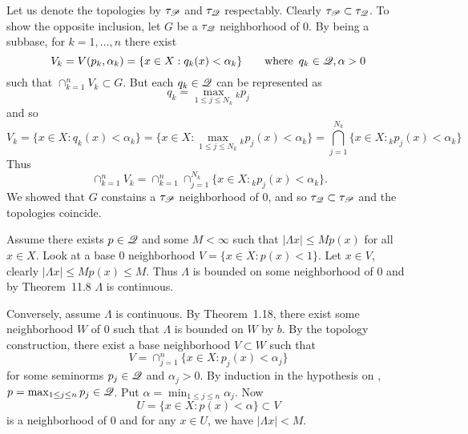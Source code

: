 \begin{enumerate}
\begin{itemize}
  Let us denote the topologies by \(\tau_{\mathscr{P}}\) and \(\tau_{\mathscr{Q}}\)
  respectably.
  Clearly  \(\tau_{\mathscr{P}} \subset \tau_{\mathscr{Q}}\).
  To show the opposite inclusion, let $G$ be a \(\tau_{\mathscr{Q}}\)
  neighborhood of $0$. By being a subbase, for \(k=1,\ldots,n\)
  there exist
  \begin{equation*}
    V_k = V(p_k,\alpha_k) = \{x\in X: q_k(x) < \alpha_k\}
     \qquad \textrm{where }\, q_k\in \mathscr{Q}, \alpha > 0
  \end{equation*}
  such that \(\cap_{k=1}^n V_k \subset G\).
  But each \(q_k\in \mathscr{Q}\) can be represented as
  \begin{equation*}
  q_k = \max_{1\leq j\leq N_k} {}_{k}p_j
  \end{equation*}
  and so 
  \begin{equation*}
  V_k = \{x\in X: q_k(x) < \alpha_k\} 
      = \{x\in X:  \max_{1\leq j\leq N_k} {}_{k}p_j(x) < \alpha_k\}
      = \bigcap_{j=1}^{N_k} \{x\in X: {}_{k}p_j(x) < \alpha_k\}
  \end{equation*}
  Thus 
  \begin{equation*}\
    \cap_{k=1}^n V_k 
     = \cap_{k=1}^n\cap_{j=1}^{N_k} \{x\in X: {}_{k}p_j(x) < \alpha_k\}.
  \end{equation*}
  We showed that $G$ constains a \(\tau_{\mathscr{P}}\) neighborhood of $0$,
  and so \(\tau_{\mathscr{Q}} \subset \tau_{\mathscr{P}}\) and the topologies
  coincide.

  Assume there exists \(p\in \mathscr{Q}\) and some \(M<\infty\) 
  such that \(|\Lambda x| \leq Mp(x)\) for  all \(x\in X\).
  Look at a base $0$ neighborhood \(V = \{x\in X: p(x)<1\}\).
  Let \(x\in V\), 
  clearly \(|\Lambda x| \leq Mp(x) \leq M\).
  Thus \(\Lambda\) is bounded on some neighborhood of $0$
  and by Theorem~11.8 \(\Lambda\) is continuous.

  Conversely, assume \(\Lambda\) is continuous. 
  By Theorem~1.18, there exist some
  neighborhood $W$ of 0 such that \(\Lambda\) is bounded on $W$ by $b$.
  By the topology construction, there exist a base neighborhood \(V\subset W\)
  such that
  \begin{equation*}
   V =  \cap_{j=1}^{n} \{x\in X: p_j(x) < \alpha_j\}
  \end{equation*}
  for some seminorms \(p_j\in \mathscr{Q}\) and \(\alpha_j > 0\).
  By induction in the hypothesis on \scrQ, 
  \(p = \max_{1\leq j\leq n} p_j \in \mathscr{Q}\).
  Put \(\alpha = \min_{1\leq j\leq n} \alpha_j\).
  Now 
  \begin{equation*}
   U = \{x\in X: p(x) < \alpha\} \subset V
  \end{equation*}
  is a neighborhood of $0$ and for any \(x\in U\), we have \(|\Lambda x| < M\).


\end{itemize}
\end{enumerate}
